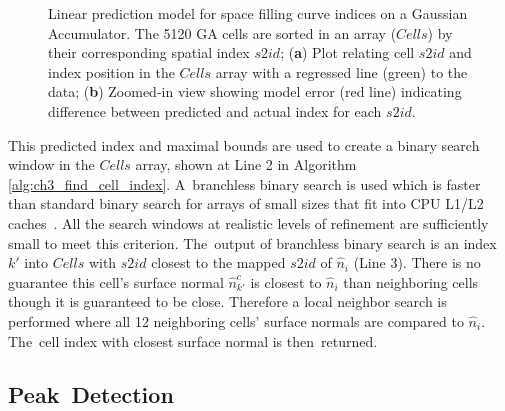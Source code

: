\begin{figure}[H]
\begin{subfigure}[t]{.35\linewidth}
    \caption{\label{fig:ch3_linear_interp_2}}
  \end{subfigure}
  \caption[Linear prediction model for space filling curve indices on a Gaussian Accumulator]{Linear prediction model for space filling curve indices on a Gaussian Accumulator. The 5120 GA cells are sorted in an array ($Cells$) by their corresponding spatial index $s2id$;  (\textbf{a}) Plot relating cell $s2id$ and index position in the $Cells$ array with a regressed line (green) to the data; (\textbf{b})  Zoomed-in view showing model error (red line) indicating  difference between predicted and actual index for each $s2id$.  
  }\label{fig:ch3_linear_interp}
\end{figure}



This predicted index and maximal bounds are used to create a binary search window in the $Cells$ array, shown at Line 2 in Algorithm \ref{alg:ch3_find_cell_index}. A~branchless binary search is used which is faster than standard binary search for arrays of small sizes that fit into CPU L1/L2 caches~\cite{khuong_array_2017}. All the search windows at realistic levels of refinement are sufficiently small to meet this criterion. The~output of branchless binary search is an index $k'$ into $Cells$ with $s2id$ closest to the mapped $s2id$ of $\hat{n}_i$ (Line 3). There is no guarantee this cell's surface normal $\hat{n}^c_{k'}$ is closest to $\hat{n}_i$ than neighboring cells though it is guaranteed to be close. Therefore a local neighbor search is performed where all 12 neighboring cells' surface normals are compared to $\hat{n}_i$. The~cell index with closest surface normal is then~returned. 


\subsection{Peak~Detection}\label{sec:ch3_methods_fastga_peak}


